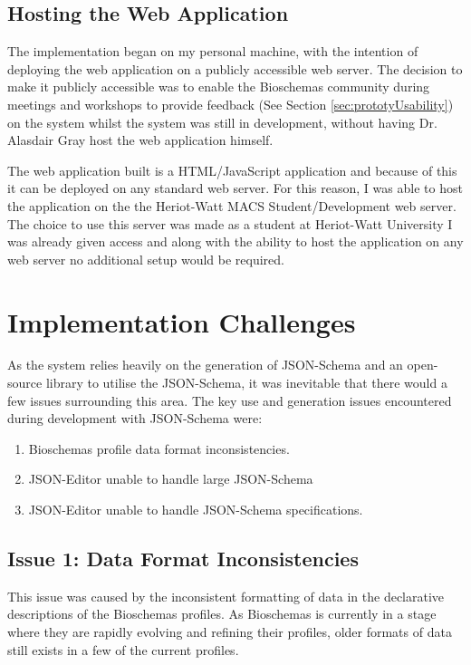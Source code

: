 \subsection{Hosting the Web Application}
The implementation began on my personal machine, with the intention of deploying the web application on a publicly accessible web server. The decision to make it publicly accessible was to enable the Bioschemas community during meetings and workshops to provide feedback (See Section \ref{sec:prototyUsability}) on the system whilst the system was still in development, without having Dr. Alasdair Gray host the web application himself.

The web application built is a HTML/JavaScript application and because of this it can be deployed on any standard web server. For this reason, I was able to host the application on the the Heriot-Watt MACS Student/Development web server. The choice to use this server was made as a student at Heriot-Watt University I was already given access and along with the ability to host the application on any web server no additional setup would be required. 



\section{Implementation Challenges}\label{sec:issues}
As the system relies heavily on the generation of JSON-Schema and an open-source library to utilise the JSON-Schema, it was inevitable that there would a few issues surrounding this area. The key use and generation issues encountered during development with JSON-Schema were:

{
\begin{enumerate}
  \item Bioschemas profile data format inconsistencies.
  \item JSON-Editor unable to handle large JSON-Schema
  \item JSON-Editor unable to handle JSON-Schema specifications.
\end{enumerate}
}

\subsection{Issue 1: Data Format Inconsistencies}
This issue was caused by the inconsistent formatting of data in the declarative descriptions of the Bioschemas profiles. As Bioschemas is currently in a stage where they are rapidly evolving and refining their profiles, older formats of data still exists in a few of the current profiles. 

